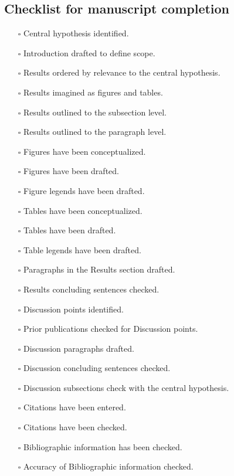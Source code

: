 \documentclass[11pt,letterpaper]{article}
\begin{document}
\subsection{Checklist for manuscript completion}
\label{sec:org1d5e47d}


\begin{itemize}
\item[{$\square$}] Central hypothesis identified.
\item[{$\square$}] Introduction drafted to define scope.
\item[{$\square$}] Results ordered by relevance to the central hypothesis.
\item[{$\square$}] Results imagined as figures and tables.
\item[{$\square$}] Results outlined to the subsection level.
\item[{$\square$}] Results outlined to the paragraph level.
\item[{$\square$}] Figures have been conceptualized.
\item[{$\square$}] Figures have been drafted.
\item[{$\square$}] Figure legends have been drafted.
\item[{$\square$}] Tables have been conceptualized.
\item[{$\square$}] Tables have been drafted.
\item[{$\square$}] Table legends have been drafted.
\item[{$\square$}] Paragraphs in the Results section drafted.
\item[{$\square$}] Results concluding sentences checked.
\item[{$\square$}] Discussion points identified.
\item[{$\square$}] Prior publications checked for Discussion points.
\item[{$\square$}] Discussion paragraphs drafted.
\item[{$\square$}] Discussion concluding sentences checked.
\item[{$\square$}] Discussion subsections check with the central hypothesis.
\item[{$\square$}] Citations have been entered.
\item[{$\square$}] Citations have been checked.
\item[{$\square$}] Bibliographic information has been checked.
\item[{$\square$}] Accuracy of Bibliographic information checked.

\end{itemize}
\end{document}
